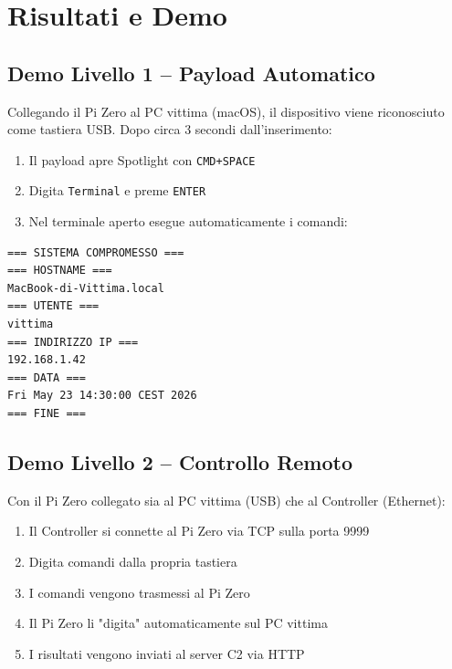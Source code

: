 \documentclass[12pt,a4paper]{article}
\begin{document}
\newpage

\section{Risultati e Demo}

\subsection{Demo Livello 1 -- Payload Automatico}
Collegando il Pi Zero al PC vittima (macOS), il dispositivo viene riconosciuto
come tastiera USB. Dopo circa 3 secondi dall'inserimento:

\begin{enumerate}
    \item Il payload apre Spotlight con \texttt{CMD+SPACE}
    \item Digita \texttt{Terminal} e preme \texttt{ENTER}
    \item Nel terminale aperto esegue automaticamente i comandi:
\end{enumerate}

\begin{lstlisting}[language=bash, caption=Output del payload sulla macchina vittima]
=== SISTEMA COMPROMESSO ===
=== HOSTNAME ===
MacBook-di-Vittima.local
=== UTENTE ===
vittima
=== INDIRIZZO IP ===
192.168.1.42
=== DATA ===
Fri May 23 14:30:00 CEST 2026
=== FINE ===
\end{lstlisting}

\subsection{Demo Livello 2 -- Controllo Remoto}
Con il Pi Zero collegato sia al PC vittima (USB) che al Controller (Ethernet):

\begin{enumerate}
    \item Il Controller si connette al Pi Zero via TCP sulla porta 9999
    \item Digita comandi dalla propria tastiera
    \item I comandi vengono trasmessi al Pi Zero
    \item Il Pi Zero li "digita" automaticamente sul PC vittima
    \item I risultati vengono inviati al server C2 via HTTP
\end{enumerate}

\newpage
\end{document}
